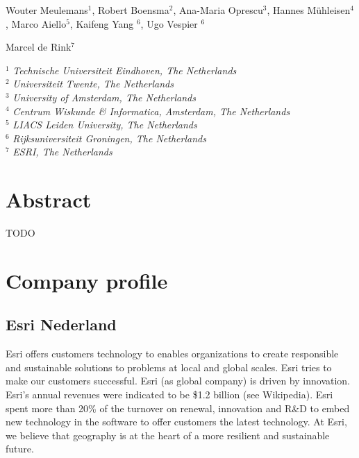 \documentclass[a4paper,11pt]{article}
\begin{document}

\vspace{0.5em}


\vspace{2em}

\noindent Wouter Meulemans$^1$, Robert Boensma$^2$, Ana-Maria Oprescu$^3$, Hannes M\"uhleisen$^4$, Marco Aiello$^5$, Kaifeng Yang $^6$, Ugo Vespier $^6$

\vspace{1em}

\noindent Marcel de Rink$^7$

\vspace{1em}

\noindent $^1$ \emph{Technische Universiteit Eindhoven, The Netherlands}\\
\noindent $^2$ \emph{Universiteit Twente, The Netherlands}\\
\noindent $^3$ \emph{University of Amsterdam, The Netherlands}\\
\noindent $^4$ \emph{Centrum Wiskunde \& Informatica, Amsterdam, The Netherlands}\\
\noindent $^5$ \emph{LIACS Leiden University, The Netherlands}\\
\noindent $^6$ \emph{Rijksuniversiteit Groningen, The Netherlands}\\
\noindent $^7$ \emph{ESRI, The Netherlands}

\section{Abstract}

TODO

\section{Company profile}

\subsection*{Esri Nederland}

Esri offers customers technology to enables organizations to create responsible and sustainable solutions to problems at local and global scales. Esri tries to make our customers successful.
Esri (as global company) is driven by innovation.
Esri's annual revenues were indicated to be \$1.2 billion (see Wikipedia).
Esri spent more than 20\% of the turnover on renewal, innovation and R\&D to embed new technology in the software to offer customers the latest technology.
At Esri, we believe that geography is at the heart of a more resilient and sustainable future.
\end{document}
